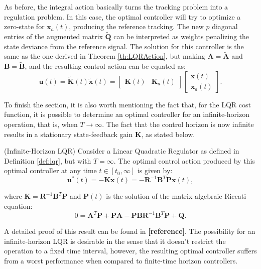 \documentclass[a4paper,11pt]{book}
\numberwithin{figure}{chapter}
\numberwithin{equation}{chapter}
\numberwithin{table}{chapter}
\newtheorem{theorem}{Theorem}[chapter]
\theoremstyle{definition}
\newcounter{boxed-theorem}
\newenvironment{boxed-theorem}[1]
{\begin{shaded} \begin{theorem}{#1}}
{\end{theorem} \end{shaded}}
\newcounter{boxed-definition}
\begin{document}
As before, the integral action basically turns the tracking problem into a regulation problem. In this case, the optimal controller will try to optimize a zero-state for $\bm{x}_a(t)$, producing the reference tracking. The new $p$ diagonal entries of the augmented matrix $\tilde{\bm{Q}}$ can be interpreted as weights penalizing the state deviance from the reference signal. The solution for this controller is the same as the one derived in Theorem \ref{th:LQRAction}, but making $\bm{A} = \tilde{\bm{A}}$ and $\bm{B} = \tilde{\bm{B}}$, and the resulting control action can be equated as:
\begin{equation}
    \bm{u}(t) = \tilde{\bm{K}}(t)\tilde{\bm{x}}(t) = \begin{bmatrix} \bm{K}(t) & \bm{K}_a(t) \end{bmatrix} \begin{bmatrix} \bm{x}(t) \\ \bm{x}_a(t) \end{bmatrix}
.\end{equation}

To finish the section, it is also worth mentioning the fact that, for the LQR cost function, it is possible to determine an optimal controller for an infinite-horizon operation, that is, when $T \to \infty$. The fact that the control horizon is now infinite results in a stationary state-feedback gain $\bm{K}$, as stated below.

\begin{boxed-theorem}{(Infinite-Horizon LQR)} \label{th:infiniteLQR}
    Consider a Linear Quadratic Regulator as defined in Definition \ref{def:lqr}, but with $T = \infty$. The optimal control action produced by this optimal controller at any time $t \in [t_0, \infty]$ is given by:
    \begin{equation}
        \bm{u}^*(t) = - \bm{K} \bm{x}(t) = - \bm{R}^{-1} \bm{B}^T \bm{P} \bm{x}(t)
    ,\end{equation}
    
    \noindent where $\bm{K} = \bm{R}^{-1} \bm{B}^T \bm{P}$ and $\bm{P}(t)$ is the solution of the matrix algebraic Riccati equation:
    \begin{equation}
        0 = \bm{A}^T \bm{P} + \bm{P} \bm{A} - \bm{P} \bm{B} \bm{R}^{-1} \bm{B}^T \bm{P} + \bm{Q}
    .\end{equation}
\end{boxed-theorem}

A detailed proof of this result can be found in \textbf{[reference]}. The possibility for an infinite-horizon LQR is desirable in the sense that it doesn't restrict the operation to a fixed time interval, however, the resulting optimal controller suffers from a worst performance when compared to finite-time horizon controllers.
\end{document}
